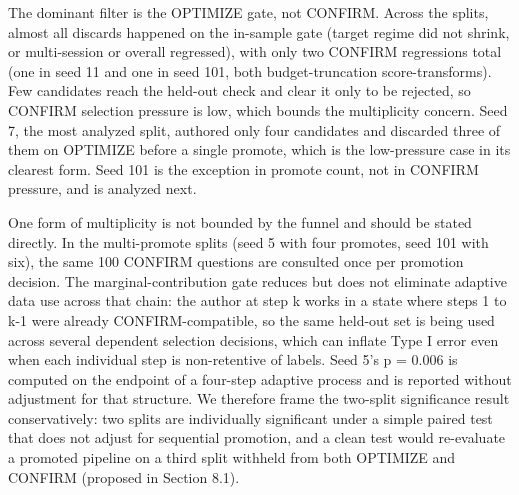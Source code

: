 \begin{center}\small
{}
\end{center}


The dominant filter is the OPTIMIZE gate, not CONFIRM. Across the splits, almost all discards happened on the in-sample gate (target regime did not shrink, or multi-session or overall regressed), with only two CONFIRM regressions total (one in seed 11 and one in seed 101, both budget-truncation score-transforms). Few candidates reach the held-out check and clear it only to be rejected, so CONFIRM selection pressure is low, which bounds the multiplicity concern. Seed 7, the most analyzed split, authored only four candidates and discarded three of them on OPTIMIZE before a single promote, which is the low-pressure case in its clearest form. Seed 101 is the exception in promote count, not in CONFIRM pressure, and is analyzed next.

One form of multiplicity is not bounded by the funnel and should be stated directly. In the multi-promote splits (seed 5 with four promotes, seed 101 with six), the same 100 CONFIRM questions are consulted once per promotion decision. The marginal-contribution gate reduces but does not eliminate adaptive data use across that chain: the author at step k works in a state where steps 1 to k-1 were already CONFIRM-compatible, so the same held-out set is being used across several dependent selection decisions, which can inflate Type I error even when each individual step is non-retentive of labels. Seed 5's p = 0.006 is computed on the endpoint of a four-step adaptive process and is reported without adjustment for that structure. We therefore frame the two-split significance result conservatively: two splits are individually significant under a simple paired test that does not adjust for sequential promotion, and a clean test would re-evaluate a promoted pipeline on a third split withheld from both OPTIMIZE and CONFIRM (proposed in Section 8.1).

